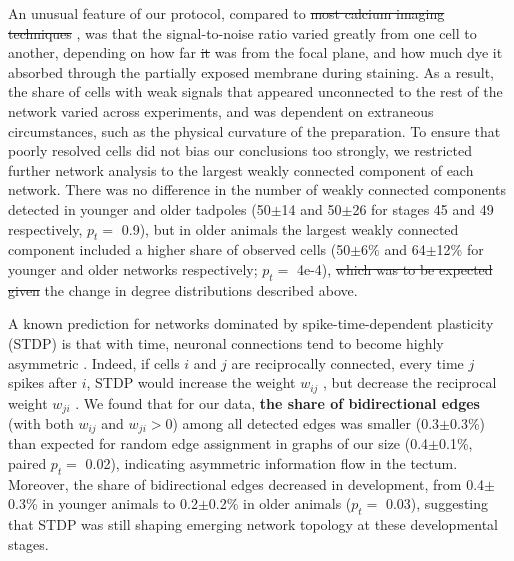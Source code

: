 \documentclass{article}
\providecommand{\DIFaddtex}[1]{{\protect\color{blue}{#1}}} %
\providecommand{\DIFdeltex}[1]{{\protect\color{red}\sout{#1}}}                      %
\providecommand{\DIFaddbegin}{} %
\providecommand{\DIFaddend}{} %
\providecommand{\DIFdelbegin}{} %
\providecommand{\DIFdelend}{} %
\providecommand{\DIFadd}[1]{\texorpdfstring{\DIFaddtex{#1}}{#1}} %
\providecommand{\DIFdel}[1]{\texorpdfstring{\DIFdeltex{#1}}{}} %
\newcommand{\DIFscaledelfig}{0.5}
\newlength{\DIFdelgraphicswidth} %
\newlength{\DIFdelgraphicsheight} %
\newcommand{\DIFaddincludegraphics}[2][]{{\color{blue}\fbox{\DIFOincludegraphics[#1]{#2}}}} %
\newcommand{\DIFdelincludegraphics}[2][]{%
\sbox{\DIFdelgraphicsbox}{\DIFOincludegraphics[#1]{#2}}%
\settoboxwidth{\DIFdelgraphicswidth}{\DIFdelgraphicsbox} %
\settoboxtotalheight{\DIFdelgraphicsheight}{\DIFdelgraphicsbox} %
\scalebox{\DIFscaledelfig}{%
\parbox[b]{\DIFdelgraphicswidth}{\usebox{\DIFdelgraphicsbox}\\[-\baselineskip] \rule{\DIFdelgraphicswidth}{0em}}\llap{\resizebox{\DIFdelgraphicswidth}{\DIFdelgraphicsheight}{%
\setlength{\unitlength}{\DIFdelgraphicswidth}%
\begin{picture}(1,1)%
\thicklines\linethickness{2pt} %
{\color[rgb]{1,0,0}\put(0,0){\framebox(1,1){}}}%
{\color[rgb]{1,0,0}\put(0,0){\line( 1,1){1}}}%
{\color[rgb]{1,0,0}\put(0,1){\line(1,-1){1}}}%
\end{picture}%
}\hspace*{3pt}}} %
} %
\DeclareRobustCommand{\DIFaddbegin}{\DIFOaddbegin \let\includegraphics\DIFaddincludegraphics} %
\DeclareRobustCommand{\DIFaddend}{\DIFOaddend \let\includegraphics\DIFOincludegraphics} %
\DeclareRobustCommand{\DIFdelbegin}{\DIFOdelbegin \let\includegraphics\DIFdelincludegraphics} %
\DeclareRobustCommand{\DIFdelend}{\DIFOaddend \let\includegraphics\DIFOincludegraphics} %
\begin{document}
An unusual feature of our \DIFaddbegin \DIFadd{high-speed imaging }\DIFaddend protocol, compared to \DIFdelbegin \DIFdel{most calcium imaging techniques }\DIFdelend \DIFaddbegin \DIFadd{more common techniques that rely on genetically encoded calcium sensors and confocal microscopy}\DIFaddend , was that the signal-to-noise ratio varied greatly from one cell to another, depending on how far \DIFdelbegin \DIFdel{it }\DIFdelend \DIFaddbegin \DIFadd{the cell }\DIFaddend was from the focal plane, and how much dye it absorbed through the partially exposed membrane during staining. As a result, the share of cells with weak signals that appeared unconnected to the rest of the network varied across experiments, and was dependent on extraneous circumstances, such as the physical curvature of the preparation. To ensure that poorly resolved cells did not bias our conclusions too strongly, we restricted further network analysis to the largest weakly connected component of each network. There was no difference in the number of weakly connected components detected in younger and older tadpoles (50$\pm$14 and 50$\pm$26 for stages 45 and 49 respectively, $p_t=$ 0.9), but in older animals the largest weakly connected component included a \DIFaddbegin \DIFadd{slightly }\DIFaddend higher share of observed cells (50$\pm$6\% and 64$\pm$12\% for younger and older networks respectively; $p_t=$ 4e-4), \DIFdelbegin \DIFdel{which was to be expected given }\DIFdelend \DIFaddbegin \DIFadd{consistent with }\DIFaddend the change in degree distributions described above.

A known prediction for networks dominated by spike-time-dependent plasticity (STDP) is that with time, neuronal connections tend to become highly asymmetric \citep{pratt2008recurrent, richards2010stdp}. Indeed, if cells $i$ and $j$ are reciprocally connected, every time $j$ spikes after $i$, STDP would increase the weight \DIFdelbegin \DIFdel{$w_{ij}$ }\DIFdelend \DIFaddbegin \DIFadd{$w_{ji}$ (for a connection leading from $i$ to $j$)}\DIFaddend , but decrease the reciprocal weight \DIFdelbegin \DIFdel{$w_{ji}$ }\DIFdelend \DIFaddbegin \DIFadd{$w_{ij}$ }\DIFaddend \citep{abbott1996ltpsequence, fiete2010chains}. We found that for our data, \textbf{the share of bidirectional edges} (\DIFaddbegin \DIFadd{those }\DIFaddend with both $w_{ij}$ and $w_{ji}>$0) among all detected edges was smaller (0.3$\pm$0.3\%) than expected for random edge assignment in graphs of our size (0.4$\pm$0.1\%, paired $p_t=$ 0.02), indicating \DIFaddbegin \DIFadd{an }\DIFaddend asymmetric information flow in the tectum. Moreover, the share of bidirectional edges decreased in development, from 0.4$\pm$0.3\% in younger animals to 0.2$\pm$0.2\% in older animals ($p_t=$ 0.03), suggesting that STDP was still shaping emerging network topology at these developmental stages.
\end{document}
